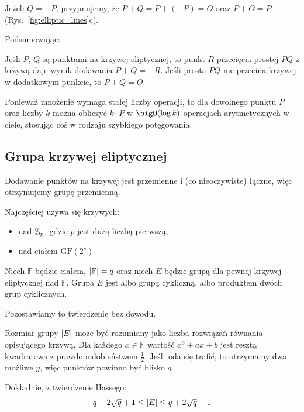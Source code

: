 Jeżeli \( Q = -P \), przyjmujemy, że \( P + Q = P + (-P) = O \) oraz \(P + O = P \) (Rys.~\ref{fig:elliptic_lines}c).

Podsumowując:
\begin{definition}[Dodawanie]
    Jeśli \( P \), \( Q \) są punktami na krzywej eliptycznej, to punkt \( R \) przecięcia prostej \( PQ \) z krzywą daje wynik dodawania \( P + Q = -R \).
    Jeśli prosta \( PQ \) nie przecina krzywej w dodatkowym punkcie, to \( P + Q = O \).
\end{definition}

Ponieważ mnożenie wymaga stałej liczby operacji, to dla dowolnego punktu \( P \) oraz liczby \( k \) można obliczyć \( k \cdot P \) w \( \bigO(\log k) \) operacjach arytmetycznych w ciele, stosując coś w rodzaju szybkiego potęgowania.

\subsection{Grupa krzywej eliptycznej}
Dodawanie punktów na krzywej jest przemienne i (co nieoczywiste) łączne, więc otrzymujemy grupę przemienną.

Najczęściej używa się krzywych:
\begin{itemize}
    \item nad \( \mathbb{Z}_p \), gdzie \( p \) jest dużą liczbą pierwszą,
    \item nad ciałem \( \text{GF}(2^s) \).
\end{itemize}

\begin{theorem}
    Niech \( \mathbb{F} \) będzie ciałem, \( \left\lvert\mathbb{F}\right\rvert = q \) oraz niech \( E \) będzie grupą dla pewnej krzywej eliptycznej nad \( \mathbb{F} \). Grupa \( E \) jest albo grupą cykliczną, albo produktem dwóch grup cyklicznych.
\end{theorem}
Pozostawiamy to twierdzenie bez dowodu.

Rozmiar grupy \( \left\lvert E\right\rvert \) może być rozumiany jako liczba rozwiązań równania opisującego krzywą.
Dla każdego \( x \in \mathbb{F} \) wartość \( x^3 + ax + b \) jest resztą kwadratową z prawdopodobieństwem \( \frac{1}{2} \). Jeśli uda się trafić, to otrzymamy dwa możliwe \( y \), więc punktów powinno być blisko \( q \).

Dokładnie, z twierdzenie Hassego: 
\[
    q - 2\sqrt{q} + 1 \leq \left\lvert E\right\rvert \leq q + 2\sqrt{q} + 1
\]